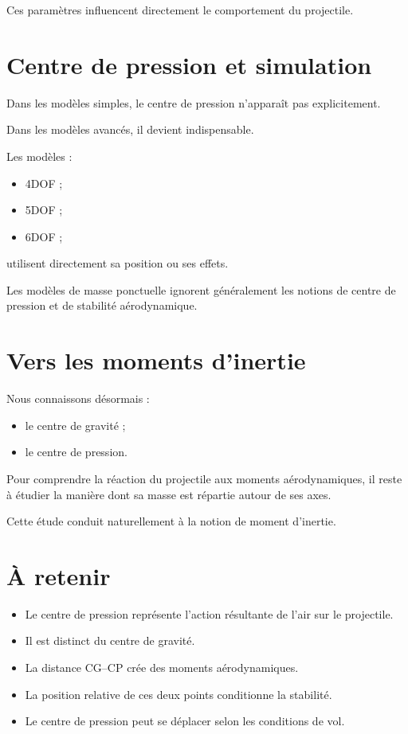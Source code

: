 Ces paramètres influencent directement le comportement du projectile.

\section{Centre de pression et simulation}

Dans les modèles simples, le centre de pression n'apparaît pas explicitement.

Dans les modèles avancés, il devient indispensable.

Les modèles :

\begin{itemize}
    \item 4DOF ;
    \item 5DOF ;
    \item 6DOF ;
\end{itemize}

utilisent directement sa position ou ses effets.

\begin{simulation}

Les modèles de masse ponctuelle ignorent généralement les notions de centre
de pression et de stabilité aérodynamique.

\end{simulation}

\section{Vers les moments d'inertie}

Nous connaissons désormais :

\begin{itemize}
    \item le centre de gravité ;
    \item le centre de pression.
\end{itemize}

Pour comprendre la réaction du projectile aux moments aérodynamiques, il
reste à étudier la manière dont sa masse est répartie autour de ses axes.

Cette étude conduit naturellement à la notion de moment d'inertie.

\section{À retenir}

\begin{aretenir}

\begin{itemize}
    \item Le centre de pression représente l'action résultante de l'air sur
          le projectile.
    \item Il est distinct du centre de gravité.
    \item La distance CG--CP crée des moments aérodynamiques.
    \item La position relative de ces deux points conditionne la stabilité.
    \item Le centre de pression peut se déplacer selon les conditions de vol.
\end{itemize}

\end{aretenir}
